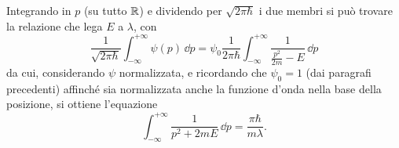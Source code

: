 Integrando in $p$ (su tutto $\mathbb{R}$) e dividendo per $\sqrt{2\pi\hbar}$ i due membri si può trovare la relazione che lega $E$ a $\lambda$, con
\begin{equation}
	\frac1{\sqrt{2\pi\hbar}}\int_{-\infty}^{+\infty}\psi(p)\,\dd p=\psi_0\frac1{2\pi\hbar}\int_{-\infty}^{+\infty}\frac1{\frac{p^2}{2m}-E}\,\dd p
\end{equation}
da cui, considerando $\psi$ normalizzata, e ricordando che $\psi_0=1$ (dai paragrafi precedenti) affinch\'e sia normalizzata anche la funzione d'onda nella base della posizione, si ottiene l'equazione
\begin{equation}
	\int_{-\infty}^{+\infty}\frac1{p^2+2mE}\,\dd p=\frac{\pi\hbar}{m\lambda}.
\end{equation}

